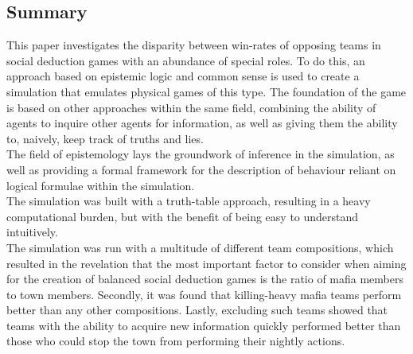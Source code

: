 \onecolumn
\begin{center}
	\section*{Summary}\label{sec:summary}
\end{center}
This paper investigates the disparity between win-rates of opposing teams in 
social deduction games with an abundance of special roles. To do  this, an 
approach based on epistemic logic and common sense is used to create a 
simulation that emulates physical games of this type. The foundation of the 
game is based on other approaches within the same field, combining the ability 
of agents to inquire other agents for information, as well as giving them the 
ability to, naively, keep track of truths and lies. \\
The field of epistemology lays the groundwork of inference in the simulation, 
as well as providing a formal framework for the description of behaviour 
reliant on logical formulae within the simulation. \\
The simulation was built with a truth-table approach, resulting in a heavy 
computational burden, but with the benefit of being easy to understand 
intuitively. \\
The simulation was run with a multitude of different team compositions, which 
resulted in the revelation that the most important factor to consider when 
aiming for the creation of balanced social deduction games is the ratio of 
mafia members to town members. Secondly, it was found that killing-heavy mafia 
teams perform better than any other compositions. Lastly, excluding such teams 
showed 
that teams with the ability to acquire new information quickly performed better 
than those who could stop the town from performing their nightly actions. 
\twocolumn